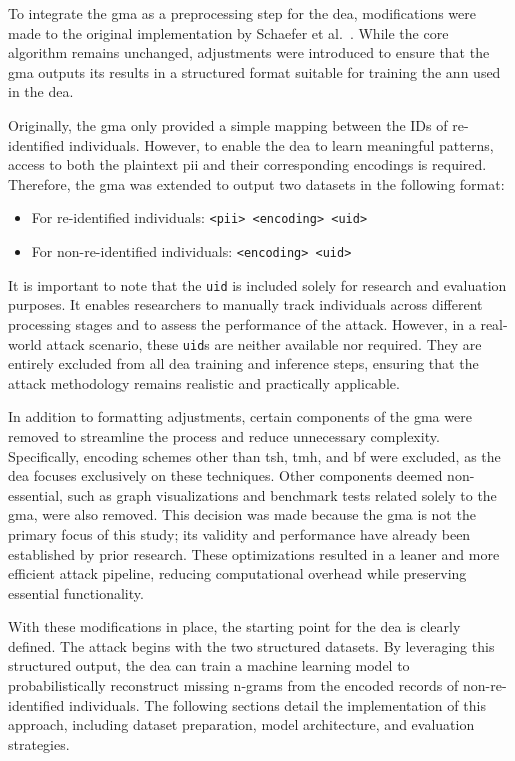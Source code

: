 To integrate the \ac{gma} as a preprocessing step for the \ac{dea}, modifications were made to the original implementation by Schaefer et al.~\cite{schaefer2024}.
While the core algorithm remains unchanged, adjustments were introduced to ensure that the \ac{gma} outputs its results in a structured format suitable for training the \ac{ann} used in the \ac{dea}.

Originally, the \ac{gma} only provided a simple mapping between the IDs of re-identified individuals.
However, to enable the \ac{dea} to learn meaningful patterns, access to both the plaintext \ac{pii} and their corresponding encodings is required.
Therefore, the \ac{gma} was extended to output two datasets in the following format:

\begin{itemize}
    \item For re-identified individuals: \texttt{<\ac{pii}> <encoding> <uid>}
    \item For non-re-identified individuals: \texttt{<encoding> <uid>}
\end{itemize}

It is important to note that the \texttt{uid} is included solely for research and evaluation purposes.
It enables researchers to manually track individuals across different processing stages and to assess the performance of the attack.
However, in a real-world attack scenario, these \texttt{uid}s are neither available nor required.
They are entirely excluded from all \ac{dea} training and inference steps, ensuring that the attack methodology remains realistic and practically applicable.

In addition to formatting adjustments, certain components of the \ac{gma} were removed to streamline the process and reduce unnecessary complexity.
Specifically, encoding schemes other than \ac{tsh}, \ac{tmh}, and \ac{bf} were excluded, as the \ac{dea} focuses exclusively on these techniques.
Other components deemed non-essential, such as graph visualizations and benchmark tests related solely to the \ac{gma},  were also removed.
This decision was made because the \ac{gma} is not the primary focus of this study; its validity and performance have already been established by prior research.
These optimizations resulted in a leaner and more efficient attack pipeline, reducing computational overhead while preserving essential functionality.

With these modifications in place, the starting point for the \ac{dea} is clearly defined.
The attack begins with the two structured datasets.
By leveraging this structured output, the \ac{dea} can train a machine learning model to probabilistically reconstruct missing n-grams from the encoded records of non-re-identified individuals.
The following sections detail the implementation of this approach, including dataset preparation, model architecture, and evaluation strategies.

